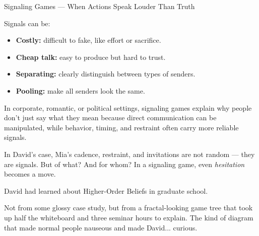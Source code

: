 \begin{TechnicalSidebar}{Signaling Games --- When Actions Speak Louder Than Truth}
    \medskip
    
    Signals can be:

    \medskip

    \begin{itemize}
      \item \textbf{Costly:} difficult to fake, like effort or sacrifice.
      \item \textbf{Cheap talk:} easy to produce but hard to trust.
      \item \textbf{Separating:} clearly distinguish between types of senders.
      \item \textbf{Pooling:} make all senders look the same.
    \end{itemize}
    
    \medskip
    
    In corporate, romantic, or political settings, signaling games explain why people don’t just say 
    what they mean because direct communication can be manipulated, while behavior, timing, and restraint 
    often carry more reliable signals.

    \medskip
    
    
    In David’s case, Mia’s cadence, restraint, and invitations are not random — 
    they are signals. But of what? And for whom? 
    In a signaling game, even \emph{hesitation} becomes a move.  
    
\end{TechnicalSidebar}

\medskip

David had learned about Higher-Order Beliefs in graduate school.

Not from some glossy case study, but from a fractal-looking game tree that took up half 
the whiteboard and three seminar hours to explain.
The kind of diagram that made normal people nauseous and made David... curious.

\medskip

